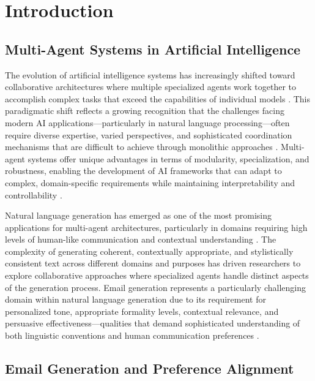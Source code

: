 \chapter{Introduction}

\section{Multi-Agent Systems in Artificial Intelligence}

The evolution of artificial intelligence systems has increasingly shifted toward collaborative architectures where multiple specialized agents work together to accomplish complex tasks that exceed the capabilities of individual models \cite{guo2024llm_multiagent, yan2025beyond_selftalk}. This paradigmatic shift reflects a growing recognition that the challenges facing modern AI applications—particularly in natural language processing—often require diverse expertise, varied perspectives, and sophisticated coordination mechanisms that are difficult to achieve through monolithic approaches \cite{talebirad2023multiagent_collaboration, krishnan2025ai_agents}. Multi-agent systems offer unique advantages in terms of modularity, specialization, and robustness, enabling the development of AI frameworks that can adapt to complex, domain-specific requirements while maintaining interpretability and controllability \cite{ma2024agentboard, cemri2025multiagent_failure}.

Natural language generation has emerged as one of the most promising applications for multi-agent architectures, particularly in domains requiring high levels of human-like communication and contextual understanding \cite{pauli2024persuasive_language, murakami2023nlg_advertising}. The complexity of generating coherent, contextually appropriate, and stylistically consistent text across different domains and purposes has driven researchers to explore collaborative approaches where specialized agents handle distinct aspects of the generation process. Email generation represents a particularly challenging domain within natural language generation due to its requirement for personalized tone, appropriate formality levels, contextual relevance, and persuasive effectiveness—qualities that demand sophisticated understanding of both linguistic conventions and human communication preferences \cite{zhang2019email_subject, chen2019gmail_smart_compose}.

\section{Email Generation and Preference Alignment}

